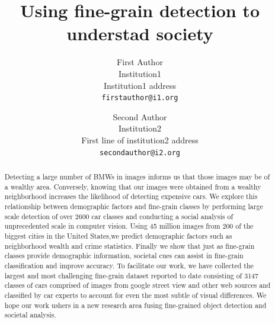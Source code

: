 \documentclass[10pt,twocolumn,letterpaper]{article}
\begin{document}
\title{Using fine-grain detection to understad society}

\author{First Author\\
Institution1\\
Institution1 address\\
{\tt\small firstauthor@i1.org}
\and
Second Author\\
Institution2\\
First line of institution2 address\\
{\tt\small secondauthor@i2.org}
}

\maketitle

\begin{abstract}
Detecting a large number of BMWs in images informs us that those images may be of a wealthy area. Conversely, knowing that our images were obtained from a wealthy neighborhood increases the likelihood of detecting expensive cars. We explore this relationship between demographic factors and fine-grain classes by performing large scale detection of over 2600 car classes and conducting a social analysis of unprecedented scale in computer vision. Using 45 million images from 200 of the biggest cities in the United States,we predict demographic factors such as neighborhood wealth and crime statistics. Finally we show that just as fine-grain classes provide demographic information, societal cues can assist in fine-grain classification and improve accuracy. To facilitate our work, we have collected the largest and most challenging fine-grain dataset reported to date consisting of 3147 classes of cars comprised of images from google street view and other web sources and classified by car experts to account for even the most subtle of visual differences. We hope our work ushers in a new research area fusing fine-grained object detection and societal analysis.
\end{abstract}
\end{document}
